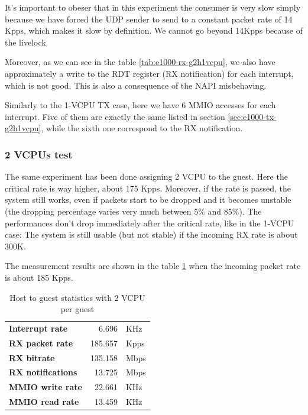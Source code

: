 It's important to obeser that in this experiment the consumer is very slow simply because we have forced the UDP sender to send to a 
constant packet rate of 14 Kpps, which makes it slow by definition. We cannot go beyond 14Kpps because of the livelock.

\vspace{0.5cm}

Moreover, as we can see in the table \ref{tab:e1000-rx-g2h1vcpu}, we also have approximately a write to the RDT register (RX 
notification) for each interrupt, which is not good. This is also a consequence of the NAPI misbehaving.

Similarly to the 1-VCPU TX case, here we have 6 MMIO accesses for each interrupt. Five of them are exactly the same listed in
section \ref{sec:e1000-tx-g2h1vcpu}, while the sixth one correspond to the RX notification.


\subsubsection{2 VCPUs test}
The same experiment has been done assigning 2 VCPU to the guest. Here the critical rate is way higher, about 175 Kpps. Moreover,
if the rate is passed, the system still works, even if packets start to be dropped and it becomes unstable (the dropping percentage
varies very much between 5\% and 85\%). The performances don't drop immediately after the critical rate, like in the 1-VCPU case: The system
is still usable (but not stable) if the incoming RX rate is about 300K.

The measurement results are shown in the table \ref{tab:e1000-rx-g2h2vcpu} when the incoming packet rate is about 185 Kpps.

\begin{table}
\begin{center}
\begin{tabular}{lrl}
\toprule
\textbf{Interrupt rate} & 6.696 & KHz\\
\textbf{RX packet rate} & 185.657 & Kpps\\
\textbf{RX bitrate} & 135.158 & Mbps\\
\textbf{RX notifications} & 13.725 & Mbps\\
\textbf{MMIO write rate} & 22.661 & KHz\\
\textbf{MMIO read rate} & 13.459 & KHz\\
\bottomrule
\end{tabular}
\end{center}
\caption[H2G with 2VCPU per guest]{Host to guest statistics with 2 VCPU per guest}
\label{tab:e1000-rx-g2h2vcpu}
\end{table}

